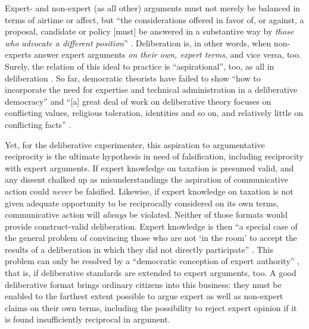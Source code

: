 Expert- and non-expert (as all other) arguments must not merely be balanced in terms of airtime or affect, but ``the considerations offered in favor of, or against, a proposal, candidate or policy [must] be answered in a substantive way by \emph{those who advocate a different position}'' \citep[K550, emphasis added]{Fishkin2009}.
Deliberation is, in other words, when non-experts answer expert arguments \emph{on their own, expert terms}, and vice versa, too.
Surely, the relation of this ideal to practice is ``aspirational'', too, as all in deliberation \citep[K2679]{Fishkin2009}.
So far, democratic theorists have failed to show ``how to incorporate the need for expertise and technical administration in a deliberative democracy'' \citep[515]{Thompson2008} and ``[a] great deal of work on deliberative theory focuses on conflicting values, religious toleration, identities and so on, and relatively little on conflicting facts'' \citep[2]{Moore2011}.

Yet, for the deliberative experimenter, this aspiration to argumentative reciprocity is the ultimate hypothesis in need of  falsification, including reciprocity with expert arguments.
If expert knowledge on taxation is presumed valid, and any dissent chalked up as misunderstandings the aspiration of communicative action could \emph{never} be falsified.
Likewise, if expert knowledge on taxation is not given adequate opportunity to be reciprocally considered on its own terms, communicative action will \emph{always} be violated.
Neither of those formats would provide construct-valid deliberation.
Expert knowledge is then ``a special case of the general problem of convincing those who are not `in the room' to accept the results of a deliberation in which they did not directly participate'' \citep[2]{Moore2011}.
This problem can only be resolved by a ``democratic conception of expert authority'' \cite[2]{Moore2011}, that is, if deliberative standards are extended to expert arguments, too.
A good deliberative format brings ordinary citizens into this business:
they must be enabled to the farthest extent possible to argue expert as well as non-expert claims on their own terms, including the possibility to reject expert opinion if it is found insufficiently reciprocal in argument.

